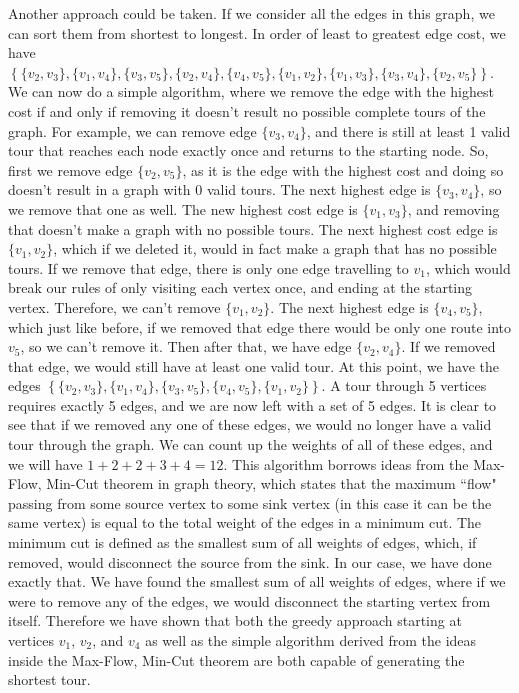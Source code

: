 \documentclass{article}
\renewcommand{\_}{\ifincsname_\else\legacyunderscore\fi}
\begin{document}
Another approach could be taken. If we consider all the edges in this graph, we can sort them from shortest to longest. In order of least to greatest edge cost, we have $\left\{\{v_2, v_3\}, \{v_1, v_4\}, \{v_3, v_5\}, \{v_2, v_4\}, \{v_4, v_5\}, \{v_1, v_2\}, \{v_1, v_3\}, \{v_3, v_4\}, \{v_2, v_5\}\right\}$. We can now do a simple algorithm, where we remove the edge with the highest cost if and only if removing it doesn't result no possible complete tours of the graph. For example, we can remove edge $\{v_3, v_4\}$, and there is still at least 1 valid tour that reaches each node exactly once and returns to the starting node. So, first we remove edge $\{v_2, v_5\}$, as it is the edge with the highest cost and doing so doesn't result in a graph with 0 valid tours. The next highest edge is $\{v_3, v_4\}$, so we remove that one as well. The new highest cost edge is $\{v_1, v_3\}$, and removing that doesn't make a graph with no possible tours. The next highest cost edge is $\{v_1, v_2\}$, which if we deleted it, would in fact make a graph that has no possible tours. If we remove that edge, there is only one edge travelling to $v_1$, which would break our rules of only visiting each vertex once, and ending at the starting vertex. Therefore, we can't remove $\{v_1, v_2\}$. The next highest edge is $\{v_4, v_5\}$, which just like before, if we removed that edge there would be only one route into $v_5$, so we can't remove it. Then after that, we have edge $\{v_2, v_4\}$. If we removed that edge, we would still have at least one valid tour. At this point, we have the edges $\left\{\{v_2, v_3\}, \{v_1, v_4\}, \{v_3, v_5\}, \{v_4, v_5\}, \{v_1, v_2\} \right\}$. A tour through 5 vertices requires exactly 5 edges, and we are now left with a set of 5 edges. It is clear to see that if we removed any one of these edges, we would no longer have a valid tour through the graph. We can count up the weights of all of these edges, and we will have $1 + 2 + 2 + 3 + 4 = 12$. This algorithm borrows ideas from the Max-Flow, Min-Cut theorem in graph theory, which states that the maximum ``flow" passing from some source vertex to some sink vertex (in this case it can be the same vertex) is equal to the total weight of the edges in a minimum cut. The minimum cut is defined as the smallest sum of all weights of edges, which, if removed, would disconnect the source from the sink. In our case, we have done exactly that. We have found the smallest sum of all weights of edges, where if we were to remove any of the edges, we would disconnect the starting vertex from itself. Therefore we have shown that both the greedy approach starting at vertices $v_1$, $v_2$, and $v_4$ as well as the simple algorithm derived from the ideas inside the Max-Flow, Min-Cut theorem are both capable of generating the shortest tour. 
\end{document}
